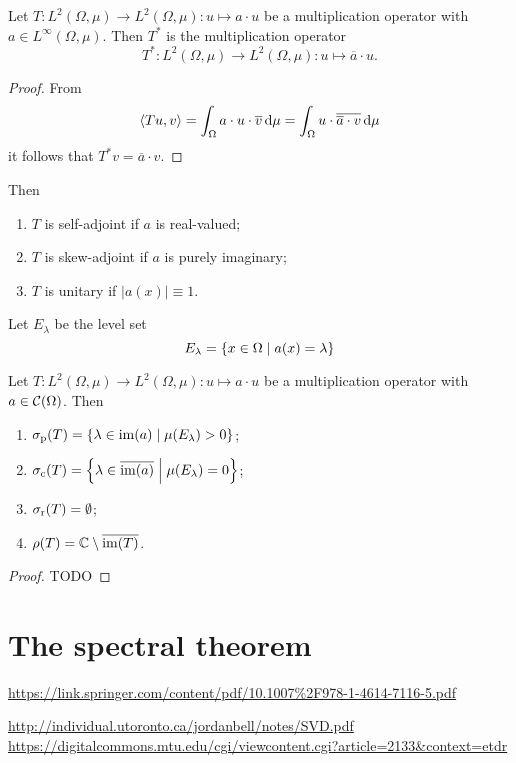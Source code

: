 \begin{lemma}
Let $T: L^2(\Omega, \mu) \to L^2(\Omega, \mu): u \mapsto a\cdot u$ be a multiplication operator with $a\in L^\infty(\Omega,\mu)$. Then $T^*$ is the multiplication operator
\[ T^*: L^2(\Omega, \mu) \to L^2(\Omega, \mu): u \mapsto \overline{a}\cdot u. \]
\end{lemma}
\begin{proof}
From 
\[ \left\langle Tu,v \right\rangle = \int_\Omega a\cdot u \cdot \overline{v}\operatorname{d \!}{\mu} = \int_\Omega u \cdot \overline{\overline{a}\cdot v}\operatorname{d \!}{\mu} \]
it follows that $T^*v = \overline{a}\cdot v$.
\end{proof}
\begin{corollary}
Then
\begin{enumerate}
\item $T$ is self-adjoint if $a$ is real-valued;
\item $T$ is skew-adjoint if $a$ is purely imaginary;
\item $T$ is unitary if $|a(x)| \equiv 1$.
\end{enumerate}
\end{corollary}

Let $E_\lambda$ be the level set
\[ E_\lambda = \left\{ x\in\Omega \;\middle|\; a(x) = \lambda \right\} \]

\begin{proposition}
Let $T: L^2(\Omega, \mu) \to L^2(\Omega, \mu): u\mapsto a\cdot u$ be a multiplication operator with $a\in \operatorname{\mathcal{C}}(\Omega)$. Then
\begin{enumerate}
\item $\sigma_\text{p}(T) = \left\{ \lambda\in \operatorname{im}(a) \;\middle|\; \mu(E_\lambda)>0 \right\}$;
\item $\sigma_\text{c}(T) = \left\{ \lambda\in \overline{\operatorname{im}(a)} \;\middle|\; \mu(E_\lambda) = 0 \right\}$;
\item $\sigma_\text{r}(T) = \emptyset$;
\item $\rho(T) = \mathbb{C}\setminus \overline{\operatorname{im}(T)}$.
\end{enumerate}
\end{proposition}
\begin{proof}
TODO
\end{proof}

\section{The spectral theorem}
\url{https://link.springer.com/content/pdf/10.1007%2F978-1-4614-7116-5.pdf}

\url{http://individual.utoronto.ca/jordanbell/notes/SVD.pdf}
\url{https://digitalcommons.mtu.edu/cgi/viewcontent.cgi?article=2133&context=etdr}

